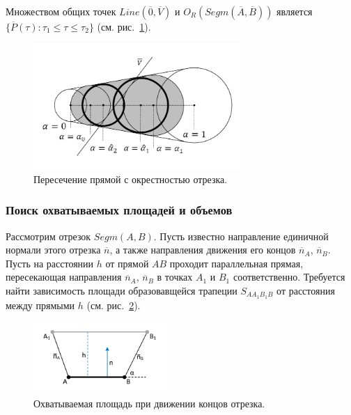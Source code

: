 Множеством общих точек $Line(\overline{0}, \overline{V})$ и $O_R(Segm(\overline{A}, \overline{B}))$ является $\{ \overline{P}(\tau): \tau_1 \le \tau \le \tau_2 \}$ (см. рис.~\ref{fig:text_1_geo_prim_spheres_nest_intersection}).

\begin{figure}[ht]
	\centering
	\includegraphics[width=0.7\textwidth]{./pics/text_1_geo_prim/spheres_nest_intersection.pdf}
	\caption{Пересечение прямой с окрестностью отрезка.}
	\label{fig:text_1_geo_prim_spheres_nest_intersection}
\end{figure}

\subsubsection{Поиск охватываемых площадей и объемов}\label{sec:text_1_geo_prim_volume}

Рассмотрим отрезок $Segm(A, B)$.
Пусть известно направление единичной нормали этого отрезка $\overline{n}$, а также направления движения его концов $\overline{n}_A$, $\overline{n}_B$.
Пусть на расстоянии $h$ от прямой $AB$ проходит параллельная прямая, пересекающая направления $\overline{n}_A$, $\overline{n}_B$ в точках $A_1$ и $B_1$ соответственно.
Требуется найти зависимость площади образовавщейся трапеции $S_{AA_1B_1B}$ от расстояния между прямыми $h$ (см. рис.~\ref{fig:text_1_geo_prim_trapezoid_partial}).

\begin{figure}[ht]
	\centering
	\includegraphics[width=0.45\textwidth]{./pics/text_1_geo_prim/trapezoid_partial.pdf}
	\caption{Охватываемая площадь при движении концов отрезка.}
	\label{fig:text_1_geo_prim_trapezoid_partial}
\end{figure}

